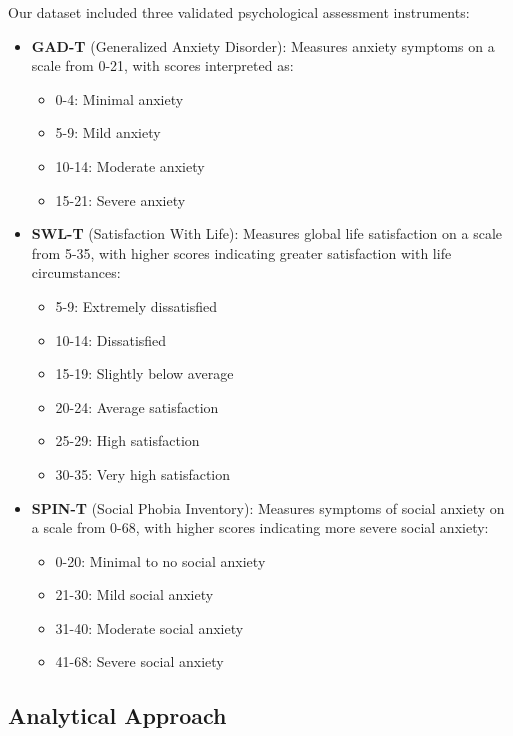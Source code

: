 \documentclass[12pt]{article}
\begin{document}
Our dataset included three validated psychological assessment instruments:

\begin{itemize}
    \item \textbf{GAD-T} (Generalized Anxiety Disorder): Measures anxiety symptoms on a scale from 0-21, with scores interpreted as:
    \begin{itemize}
        \item 0-4: Minimal anxiety
        \item 5-9: Mild anxiety
        \item 10-14: Moderate anxiety
        \item 15-21: Severe anxiety
    \end{itemize}

    \item \textbf{SWL-T} (Satisfaction With Life): Measures global life satisfaction on a scale from 5-35, with higher scores indicating greater satisfaction with life circumstances:
    \begin{itemize}
        \item 5-9: Extremely dissatisfied
        \item 10-14: Dissatisfied
        \item 15-19: Slightly below average
        \item 20-24: Average satisfaction
        \item 25-29: High satisfaction
        \item 30-35: Very high satisfaction
    \end{itemize}

    \item \textbf{SPIN-T} (Social Phobia Inventory): Measures symptoms of social anxiety on a scale from 0-68, with higher scores indicating more severe social anxiety:
    \begin{itemize}
        \item 0-20: Minimal to no social anxiety
        \item 21-30: Mild social anxiety
        \item 31-40: Moderate social anxiety
        \item 41-68: Severe social anxiety
    \end{itemize}
\end{itemize}

\subsection{Analytical Approach}
\end{document}
